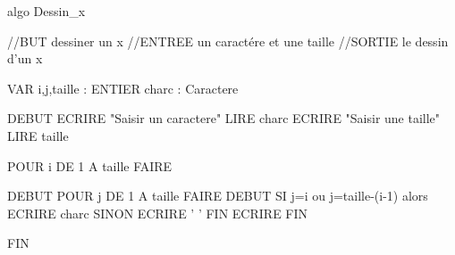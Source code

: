 algo Dessin_x

//BUT  dessiner un x 
//ENTREE    un caractére et une taille
//SORTIE  le dessin d'un x 

VAR 
	i,j,taille : ENTIER
	charc : Caractere
	
DEBUT
	ECRIRE "Saisir un caractere"
	LIRE charc
	ECRIRE "Saisir une taille"
	LIRE taille
	
	POUR i DE 1 A taille FAIRE
	
	DEBUT
	    POUR j DE 1 A taille FAIRE
		DEBUT
		SI j=i ou j=taille-(i-1) alors
		   ECRIRE charc
		      SINON 
		        ECRIRE ' '
		FIN
	ECRIRE
	FIN
	
	
FIN
	
